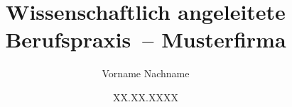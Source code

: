 %
%

\newcommand{\artderarbeit}{Wissenschaftlich angeleitete Berufspraxis}

\newcommand{\fach}{Name des Fachs / der Veranstaltung}

\newcommand{\abschluss}{}

\newcommand{\fullname}{Vorname Nachname}
\newcommand{\email}{vorname.nachname@stud-provadis-hochschule.de}
\newcommand{\matnr}{XXXX}
\newcommand{\studiengang}{Business Information Management}
\newcommand{\studiengruppe}{BBIM26}
\newcommand{\telMobil}{+49 XXX XXXXXXX}
\newcommand{\fakultaet}{Informatik und Wirtschaftsinformatik}

\newcommand{\titel}{Textvorlage für wissenschaftliche Arbeiten\\
Titel und Untertitel der Arbeit}
\newcommand{\unternehmen}{Musterfirma}

\newcommand{\abgabedatum}{XX.XX.XXXX}
\newcommand{\ort}{Frankfurt am Main}

\newcommand{\unterschrift}{}

\newcommand{\refFirst}{Prof. Dr. First Last}
\newcommand{\refSecond}{}

\newif\ifharvard
\harvardtrue

\newif\ifKIverwendet
\KIverwendettrue


\title{\artderarbeit\ -- \unternehmen}
\author{\fullname}
\date{\abgabedatum}
